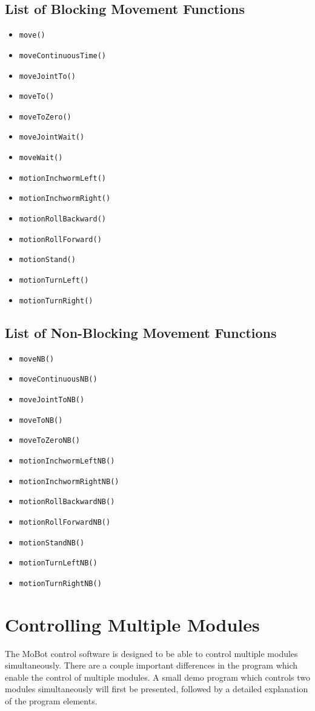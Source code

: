 \documentclass{article}
\begin{document}
\subsection{List of Blocking Movement Functions}
\begin{itemize}
\item \texttt{move()}
\item \texttt{moveContinuousTime()}
\item \texttt{moveJointTo()}
\item \texttt{moveTo()}
\item \texttt{moveToZero()}
\item \texttt{moveJointWait()}
\item \texttt{moveWait()}
\item \texttt{motionInchwormLeft()}
\item \texttt{motionInchwormRight()}
\item \texttt{motionRollBackward()}
\item \texttt{motionRollForward()}
\item \texttt{motionStand()}
\item \texttt{motionTurnLeft()}
\item \texttt{motionTurnRight()}
\end{itemize}

\subsection{List of Non-Blocking Movement Functions}
\begin{itemize}
\item \texttt{moveNB()}
\item \texttt{moveContinuousNB()}
\item \texttt{moveJointToNB()}
\item \texttt{moveToNB()}
\item \texttt{moveToZeroNB()}
\item \texttt{motionInchwormLeftNB()}
\item \texttt{motionInchwormRightNB()}
\item \texttt{motionRollBackwardNB()}
\item \texttt{motionRollForwardNB()}
\item \texttt{motionStandNB()}
\item \texttt{motionTurnLeftNB()}
\item \texttt{motionTurnRightNB()}
\end{itemize}

\section{Controlling Multiple Modules}
The MoBot control software is designed to be able to control multiple modules
simultaneously. There are a couple important differences in the program 
which enable the control of multiple modules. A small demo program which
controls two modules simultaneously will first be presented, followed by
a detailed explanation of the program elements.
\end{document}
